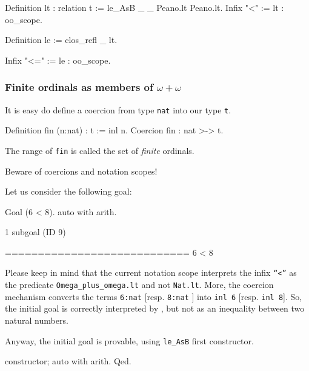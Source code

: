 \begin{Coqsrc}
Definition lt : relation t := le_AsB _ _ Peano.lt Peano.lt.
Infix "<" := lt : oo_scope.

Definition le := clos_refl _ lt.

Infix "<=" := le : oo_scope.
\end{Coqsrc}

\subsubsection{Finite ordinals as members of \texorpdfstring{$\omega+\omega$}{omega+omega}}

It is easy do define a coercion from type \texttt{nat} into our type \texttt{t}.

\begin{Coqsrc}
Definition fin (n:nat) : t := inl n.
Coercion fin : nat >-> t.
\end{Coqsrc}

The range of \texttt{fin} is called the set of \emph{finite} ordinals.


\begin{remark}
Beware of coercions and notation scopes!

Let us consider the following goal:

\begin{Coqsrc}
 Goal (6 < 8).
 auto with arith.
\end{Coqsrc}


\begin{Coqanswer}
1 subgoal (ID 9)
  
  ============================
  6 < 8
\end{Coqanswer}

Please keep in mind that the current notation scope interprets the infix \texttt{``<''} as the predicate \texttt{Omega\_plus\_omega.lt} and not \texttt{Nat.lt}. More,  the coercion mechanism converts the terms \texttt{6:nat} [resp. \texttt{8:nat} ]
into \texttt{inl 6} [resp. \texttt{inl 8}].  So, the initial goal is correctly interpreted by \coq{}, but not as an inequality between two natural numbers.

Anyway, the initial goal is provable, using \texttt{le\_AsB} first constructor.

\begin{Coqsrc}
  constructor; auto with arith.
Qed.
\end{Coqsrc}

\end{remark}

